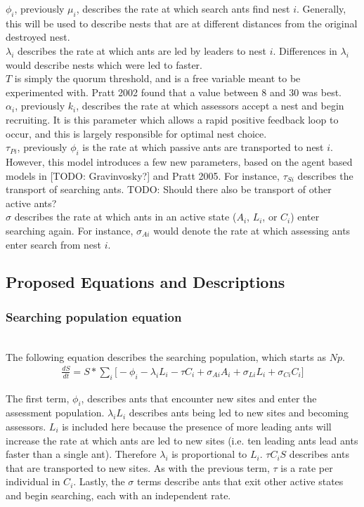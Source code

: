 \documentclass[letterpaper]{article}
\begin{document}
$\phi_i$, previously $\mu_i$, describes the rate at which search ants find nest $i$. 
Generally, this will be used to describe nests that are at different distances from the original destroyed nest. \\
$\lambda_i$ describes the rate at which ants are led by leaders to nest $i$. 
Differences in $\lambda_i$ would describe nests which were led to faster. \\
$T$ is simply the quorum threshold, and is a free variable meant to be experimented with.
Pratt 2002 found that a value between $8$ and $30$ was best. \\
$\alpha_i$, previously $k_i$, describes the rate at which assessors accept a nest and begin recruiting.
It is this parameter which allows a rapid positive feedback loop to occur, and this is largely responsible for optimal nest choice. \\
$\tau_{Pi}$, previously $\phi_i$ is the rate at which passive ants are transported to nest $i$.
However, this model introduces a few new parameters, based on the agent based models in [TODO: Gravinvosky?] and Pratt 2005. 
For instance, $\tau_{Si}$ describes the transport of searching ants. 
TODO: Should there also be transport of other active ants? \\
$\sigma$ describes the rate at which ants in an active state ($A_i$, $L_i$, or $C_i$) enter searching again.
For instance, $\sigma_{Ai}$ would denote the rate at which assessing ants enter search from nest $i$.

\subsection{Proposed Equations and Descriptions}

\subsubsection{Searching population equation}
\hfill\\

The following equation describes the searching population, which starts as $Np$.
\begin{multline}
      \frac{dS}{dt} = S * \sum_i \big[- \phi_i - \lambda_iL_i - \tau C_i + \sigma_{Ai}A_i + \sigma_{Li}L_i + \sigma_{Ci}C_i \big]
\end{multline}

The first term, $\phi_i$, describes ants that encounter new sites and enter the assessment population.
$\lambda_iL_i$ describes ants being led to new sites and becoming assessors. $L_i$ is included here because the presence of more leading ants will increase the rate at which ants are led to new sites (i.e. ten leading ants lead ants faster than a single ant). Therefore $\lambda_i$ is proportional to $L_i$.
$\tau C_iS$ describes ants that are transported to new sites. As with the previous term, $\tau$ is a rate per individual in $C_i$.
Lastly, the $\sigma$ terms describe ants that exit other active states and begin searching, each with an independent rate.
\end{document}
